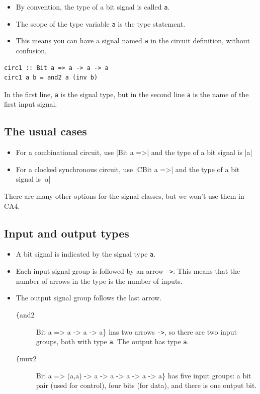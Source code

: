 \documentclass[]{svmono}
\begin{document}
\begin{itemize}
\item By convention, the type of a bit signal is called \texttt{a}.
\item The scope of the type variable \texttt{a} is the type statement.
\item This means you can have a signal named \texttt{a} in the circuit
definition, without confusion.
\end{itemize}

\begin{verbatim}
circ1 :: Bit a => a -> a -> a
circ1 a b = and2 a (inv b)
\end{verbatim}

In the first line, \texttt{a} is the signal type, but in the
second line \texttt{a} is the name of the first input signal.
\subsection*{The usual cases}
\label{sec:org8970c21}

\begin{itemize}
\item For a combinational circuit, use |Bit a =>| and the type of a
bit signal is |a|
\item For a clocked synchronous circuit, use |CBit a =>| and the type
of a bit signal is |a|
\end{itemize}

There are many other options for the signal classes, but we won't
use them in CA4.
\subsection*{Input and output types}
\label{sec:org7b0936e}

\begin{itemize}
\item A bit signal is indicated by the signal type \texttt{a}.
\item Each input signal group is followed by an arrow \texttt{->}.
This means that the number of arrows in the type is the number
of inputs.
\item The output signal group follows the last arrow.

\begin{description}
\item[{\texttt\{and2}] Bit a => a -> a -> a\} has two arrows
\texttt{->}, so there are two input groups, both with type
\texttt{a}.  The output has type \texttt{a}.
\item[{\texttt\{mux2}] Bit a => (a,a) -> a -> a -> a -> a -> a\}
has five input groups: a bit pair (used for control), four bits
(for data), and there is one output bit.
\end{description}
\end{itemize}
\end{document}
